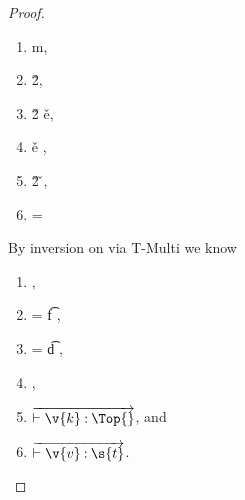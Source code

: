 \begin{lemma}
\begin{proof}
\begin{case}[T-App]
\begin{itemize}
\begin{subcase}[B-BetaMulti]
  \begin{enumerate}
    \item
  \opsem {\openv{}}
         {}
         { {m}},
    \item
  \opsem {\openv{}}
         {}
         {\v{2}},
    \item
  \opsem {\openv{}}
         { {\v{2}}}
         {\v{e}},
    \item
  \getmethod {\disptable{}}
             {\v{e}}
             {},
    \item
  \opsem {\openv{}}
         { {\v{2}}}
         {\v{}},
       \item {\disptable{}} = {}
     \end{enumerate}

     By inversion on  via T-Multi we know 
     \begin{enumerate}[resume]
       \item
                {
                            {}}
                {},
           
         \item {} = {\ArrowOne {\x{}} {\s{}}
                                                       {\t{f}}
                                                       {
                                                                   {}}
                                                       {}},
         \item {} = {\ArrowOne {\x{}} {\s{}}
                                                       {\t{d}}
                                                       {
                                                                   {}}
                                                       {}},
       \item
                {
                            {}}
                {},
              \item
  $\overrightarrow{\judgementtwo{}{\hastype{\v{k}}{\Top{}}}}$, and 
\item
  $\overrightarrow{\judgementtwo{}{\hastype{\v{v}}{\s{t}}}}$.
  \end{enumerate}


\end{subcase}
\end{itemize}
\end{case}
\end{proof}
\end{lemma}
